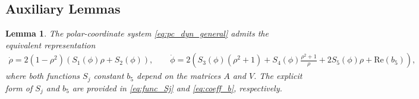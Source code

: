\documentclass[10pt]{article}
\newtheorem{lemma}[theorem]{Lemma}
\theoremstyle{definition}
\theoremstyle{definition}
\numberwithin{equation}{section}
\newcommand{\re}[1]{\mathrm{Re}\left(#1\right)}
\newcommand{\Drho}{\Dot{\rho}}
\newcommand{\Dphi}{\Dot{\phi}}
\begin{document}
\subsection{Auxiliary Lemmas}
\begin{lemma}\label{lem:pc_dyn_general_expand}
The polar-coordinate system \eqref{eq:pc_dyn_general} admits the equivalent representation
\begin{equation*}
    \begin{split}
        \Drho = 2(1-\rho^2) \left( S_1(\phi) \rho + S_2(\phi) \right), \qquad
        \Dphi = 2 \left( S_3(\phi) (\rho^2+1) + S_4(\phi) \frac{\rho^2 + 1}{\rho} + 2S_5(\phi) \rho + \re{b_5} \right),
    \end{split}
    \end{equation*}
where both functions $S_{j}$ constant $b_5$ depend on the matrices $A$ and $V$.
The explicit form of $S_j$ and $b_5$ are provided in \eqref{eq:func_Sj} and \eqref{eq:coeff_b}, respectively.
\end{lemma}
\end{document}
